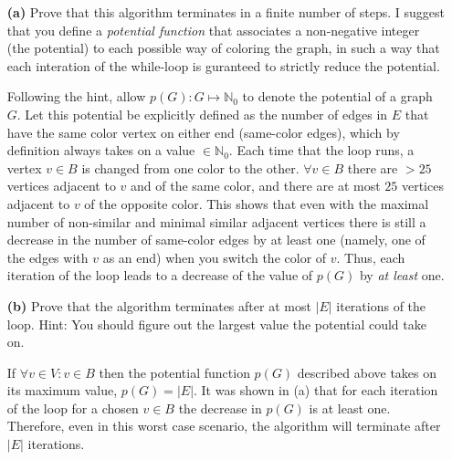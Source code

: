 \documentclass[11pt]{article}
\begin{document}
\begin{itemize}
\item[{\bf (a)}] Prove that this algorithm terminates in a finite number of steps. 
I suggest that you define a \emph{potential function} that associates a non-negative
integer (the potential) to each possible way of coloring the graph, in such a way that
each interation of the while-loop is guranteed to strictly reduce the potential.

Following the hint, allow $p(G):G\mapsto\mathbb{N}_0$ to denote the potential of a graph $G$.
 Let this potential be explicitly defined as the number of edges in $E$ that have the same color
vertex on either end (same-color edges), which by definition always takes on a value $\in \mathbb{N}_0$. 
Each time that the loop runs, a vertex $v\in B$ is changed from 
one color to the other.  $\forall v \in B$ there are $> 25$ vertices adjacent to $v$ and of the same color,
and there are at most $25$ vertices adjacent to $v$ of the opposite color. 
This shows that even with the maximal number of non-similar and minimal similar adjacent 
vertices there is still a decrease in the number of same-color edges  by at least one (namely, one 
of the edges with $v$ as an end)
when you switch the color of $v$. Thus, each iteration of the loop leads to a decrease of
the value of $p(G)$ by \emph{at least} one.

\item[{\bf (b)}] Prove that the algorithm terminates after at most $|E|$ iterations
of the loop. Hint: You should figure out the largest value the potential could take on.

If $\forall v \in V: v\in B$ then  the potential function $p(G)$ described above
takes on its maximum value, $p(G)= |E|$.  It was shown in (a) that for each iteration of the loop
for a chosen $v \in B$ the decrease in $p(G)$ is at least one. Therefore, even in this worst case 
scenario, the algorithm will terminate after $|E|$ iterations.


\end{itemize}
\end{document}
